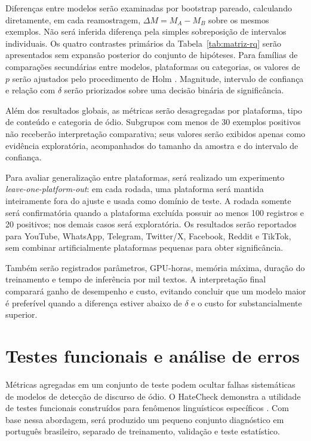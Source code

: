 Diferenças entre modelos serão examinadas por bootstrap pareado, calculando
diretamente, em cada reamostragem, $\Delta M=M_A-M_B$ sobre os mesmos exemplos.
Não será inferida diferença pela simples sobreposição de intervalos individuais.
Os quatro contrastes primários da Tabela~\ref{tab:matriz-rq} serão apresentados
sem expansão posterior do conjunto de hipóteses. Para famílias de comparações
secundárias entre modelos, plataformas ou categorias, os valores de $p$ serão
ajustados pelo procedimento de Holm \cite{holm1979procedure}. Magnitude,
intervalo de confiança e relação
com $\delta$ serão priorizados sobre uma decisão binária de significância.

Além dos resultados globais, as métricas serão desagregadas por plataforma,
tipo de conteúdo e categoria de ódio. Subgrupos com menos de 30 exemplos
positivos não receberão interpretação comparativa; seus valores serão exibidos
apenas como evidência exploratória, acompanhados do tamanho da amostra e do
intervalo de confiança.

Para avaliar generalização entre plataformas, será realizado um experimento
\textit{leave-one-platform-out}: em cada rodada, uma plataforma será mantida
inteiramente fora do ajuste e usada como domínio de teste. A rodada somente será
confirmatória quando a plataforma excluída possuir ao menos 100 registros e 20
positivos; nos demais casos será exploratória. Os resultados serão reportados
para YouTube, WhatsApp, Telegram, Twitter/X, Facebook, Reddit e TikTok, sem
combinar artificialmente plataformas pequenas para obter significância.

Também serão registrados parâmetros, GPU-horas, memória máxima, duração do
treinamento e tempo de inferência por mil textos. A interpretação final comparará
ganho de desempenho e custo, evitando concluir que um modelo maior é preferível
quando a diferença estiver abaixo de $\delta$ e o custo for substancialmente
superior.

\section{Testes funcionais e análise de erros}
\label{sec:testes-funcionais}

Métricas agregadas em um conjunto de teste podem ocultar falhas sistemáticas de
modelos de detecção de discurso de ódio. O HateCheck demonstra a utilidade de
testes funcionais construídos para fenômenos linguísticos específicos
\cite{rottger2021hatecheck}. Com base nessa abordagem, será produzido um pequeno
conjunto diagnóstico em português brasileiro, separado de treinamento,
validação e teste estatístico.


